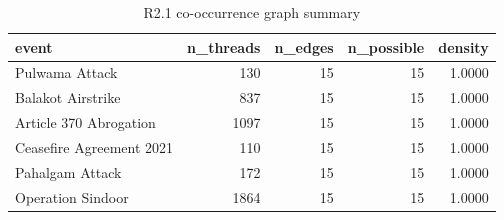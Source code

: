 \begin{table}
\caption{R2.1 co-occurrence graph summary}
\label{tab:r1r2_cooccurrence_summary}
\begin{tabular}{lrrrr}
\toprule
event & n\_threads & n\_edges & n\_possible & density \\
\midrule
Pulwama Attack & 130 & 15 & 15 & 1.0000 \\
Balakot Airstrike & 837 & 15 & 15 & 1.0000 \\
Article 370 Abrogation & 1097 & 15 & 15 & 1.0000 \\
Ceasefire Agreement 2021 & 110 & 15 & 15 & 1.0000 \\
Pahalgam Attack & 172 & 15 & 15 & 1.0000 \\
Operation Sindoor & 1864 & 15 & 15 & 1.0000 \\
\bottomrule
\end{tabular}
\end{table}
